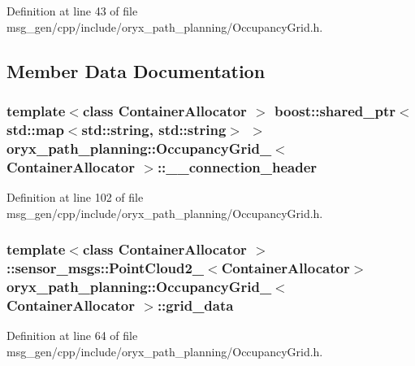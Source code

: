\-Definition at line 43 of file msg\-\_\-gen/cpp/include/oryx\-\_\-path\-\_\-planning/\-Occupancy\-Grid.\-h.



\subsection{\-Member \-Data \-Documentation}
\subsubsection[{\-\_\-\-\_\-connection\-\_\-header}]{\setlength{\rightskip}{0pt plus 5cm}template$<$class Container\-Allocator $>$ boost\-::shared\-\_\-ptr$<$std\-::map$<$std\-::string, std\-::string$>$ $>$ {\bf oryx\-\_\-path\-\_\-planning\-::\-Occupancy\-Grid\-\_\-}$<$ \-Container\-Allocator $>$\-::{\bf \-\_\-\-\_\-connection\-\_\-header}}\label{structoryx__path__planning_1_1OccupancyGrid___a82f0d2a226dc573310852746dcff6aea}


\-Definition at line 102 of file msg\-\_\-gen/cpp/include/oryx\-\_\-path\-\_\-planning/\-Occupancy\-Grid.\-h.

\subsubsection[{grid\-\_\-data}]{\setlength{\rightskip}{0pt plus 5cm}template$<$class Container\-Allocator $>$ \-::sensor\-\_\-msgs\-::\-Point\-Cloud2\-\_\-$<$\-Container\-Allocator$>$ {\bf oryx\-\_\-path\-\_\-planning\-::\-Occupancy\-Grid\-\_\-}$<$ \-Container\-Allocator $>$\-::{\bf grid\-\_\-data}}\label{structoryx__path__planning_1_1OccupancyGrid___a352883cfa156b3f102c7a4c98d00f849}


\-Definition at line 64 of file msg\-\_\-gen/cpp/include/oryx\-\_\-path\-\_\-planning/\-Occupancy\-Grid.\-h.

